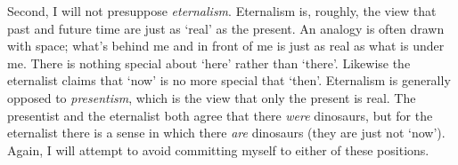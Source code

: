 \documentclass[11pt]{article}
\begin{document}
\begin{spacing}{1.5}
Second, I will not presuppose {\em eternalism}.  Eternalism is,
roughly, the view that past and future time are just as `real' as the
present.  An analogy is often drawn with space; what's behind me and
in front of me is just as real as what is under me.  There is nothing
special about `here' rather than `there'.  Likewise the eternalist
claims that `now' is no more special that `then'.  Eternalism is
generally opposed to {\em presentism}, which is the view that only the
present is real.  The presentist and the eternalist both agree that
there {\em were} dinosaurs, but for the eternalist there is a sense in
which there {\em are} dinosaurs (they are just not `now').  Again, I
will attempt to avoid committing myself to either of these positions.

\ifstandalone
\end{spacing}


\fi
\end{document}
